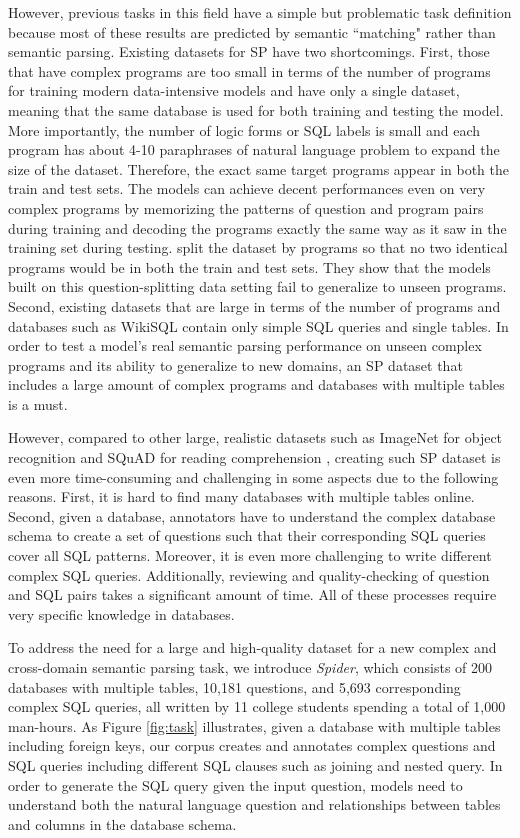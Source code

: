 \documentclass[11pt,a4paper]{article}
\begin{document}
However, previous tasks in this field have a simple but problematic task definition because most of these results are predicted by semantic ``matching" rather than semantic parsing. Existing datasets for SP have two shortcomings.
First, those that have complex programs \cite{zelle96,li2014constructing,yaghmazadeh2017sqlizer,iyer17} are too small in terms of the number of programs for training modern data-intensive models and have only a single dataset, meaning that the same database is used for both training and testing the model. More importantly, the number of logic forms or SQL labels is small and each program has about 4-10 paraphrases of natural language problem to expand the size of the dataset. Therefore, the exact same target programs appear in both the train and test sets. The models can achieve decent performances even on very complex programs by memorizing the patterns of question and program pairs during training and decoding the programs exactly the same way as it saw in the training set during testing. \citet{cathy18} split the dataset by programs so that no two identical programs would be in both the train and test sets. They show that the models built on this question-splitting data setting fail to generalize to unseen programs.
Second, existing datasets that are large in terms of the number of programs and databases such as WikiSQL \cite{Zhong2017} contain only simple SQL queries and single tables. In order to test a model's real semantic parsing performance on unseen complex programs and its ability to generalize to new domains, an SP dataset that includes a large amount of complex programs and databases with multiple tables is a must.

However, compared to other large, realistic datasets such as ImageNet for object recognition \cite{imagenet_cvpr09} and SQuAD for reading comprehension \cite{Pranav16}, creating such SP dataset is even more time-consuming and challenging in some aspects due to the following reasons.
First, it is hard to find many databases with multiple tables online. Second, given a database, annotators have to understand the complex database schema to create a set of questions such that their corresponding SQL queries cover all SQL patterns. Moreover, it is even more challenging to write different complex SQL queries. Additionally, reviewing and quality-checking of question and SQL pairs takes a significant amount of time. All of these processes require very specific knowledge in databases. 


To address the need for a large and high-quality dataset for a new complex and cross-domain semantic parsing task, we introduce {\it Spider}, which consists of 200 databases with multiple tables, 10,181 questions, and 5,693 corresponding complex SQL queries, all written by 11 college students spending a total of 1,000 man-hours.
As Figure \ref{fig:task} illustrates, given a database with multiple tables including foreign keys, our corpus creates and annotates complex questions and SQL queries including different SQL clauses such as joining and nested query.
In order to generate the SQL query given the input question, models need to understand both the natural language question and relationships between tables and columns in the database schema.
\end{document}
